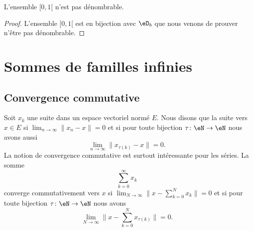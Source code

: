 \begin{corollary}
    L'ensemble \( \mathopen[ 0 , 1 [\) n'est pas dénombrable.
\end{corollary}

\begin{proof}
    L'ensemble \( \mathopen[ 0 , 1 [\) est en bijection avec \( \eD_b\) que nous venons de prouver n'être pas dénombrable.
\end{proof}

\section{Sommes de familles infinies}
\label{SECooHHDXooUgLhHR}

\subsection{Convergence commutative}

\begin{definition}
    Soit \( x_k\) une suite dans un espace vectoriel normé \( E\). Nous disons que la suite  vers \( x\in E\) si \( \lim_{n\to \infty}\| x_n-x \| =0\) et si pour toute bijection \( \tau\colon \eN\to \eN\) nous avons aussi
    \begin{equation}
        \lim_{n\to \infty} \| x_{\tau(k)}-x \|=0.
    \end{equation}
    La notion de convergence commutative est surtout intéressante pour les séries. La somme
    \begin{equation}
        \sum_{k=0}^{\infty}x_k
    \end{equation}
    converge commutativement vers \( x\) si \( \lim_{N\to \infty} \| x-\sum_{k=0}^Nx_k \|=0\) et si pour toute bijection \( \tau\colon \eN\to \eN\) nous avons
    \begin{equation}
        \lim_{N\to \infty} \| x-\sum_{k=0}^Nx_{\tau(k)} \|=0.
    \end{equation}
\end{definition}

